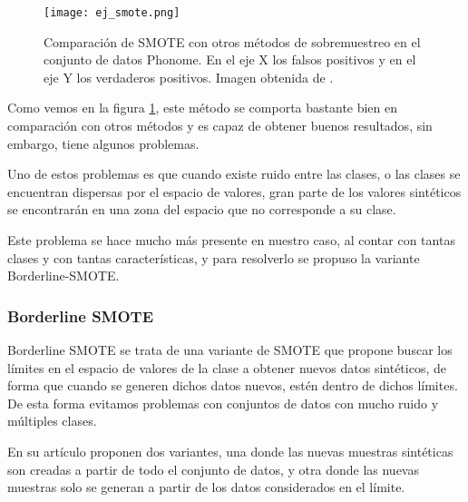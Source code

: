 \begin{figure}[H]
	\centering
	\texttt{[image: ej\_smote.png]}
	\caption{Comparación de SMOTE con otros métodos de sobremuestreo en el conjunto de datos Phonome. En el eje X los falsos positivos y en el eje Y los verdaderos positivos. Imagen obtenida de \cite{SMOTE}.}
	\label{fig:comparacionSMOTE}
\end{figure}

Como vemos en la figura \ref{fig:comparacionSMOTE}, este método se comporta bastante bien en comparación con otros métodos y es capaz de obtener buenos resultados, sin embargo, tiene algunos problemas.

Uno de estos problemas es que cuando existe ruido entre las clases, o las clases se encuentran dispersas por el espacio de valores, gran parte de los valores sintéticos se encontrarán en una zona del espacio que no corresponde a su clase.

Este problema se hace mucho más presente en nuestro caso, al contar con tantas clases y con tantas características, y para resolverlo se propuso la variante Borderline-SMOTE.

\subsubsection{Borderline SMOTE}


Borderline SMOTE \cite{BL-SMOTE} se trata de una variante de SMOTE que propone buscar los límites en el espacio de valores de la clase a obtener nuevos datos sintéticos, de forma que cuando se generen dichos datos nuevos, estén dentro de dichos límites. De esta forma evitamos problemas con conjuntos de datos con mucho ruido y múltiples clases.

En su artículo proponen dos variantes, una donde las nuevas muestras sintéticas son creadas a partir de todo el conjunto de datos, y otra donde las nuevas muestras solo se generan a partir de los datos considerados en el límite.


